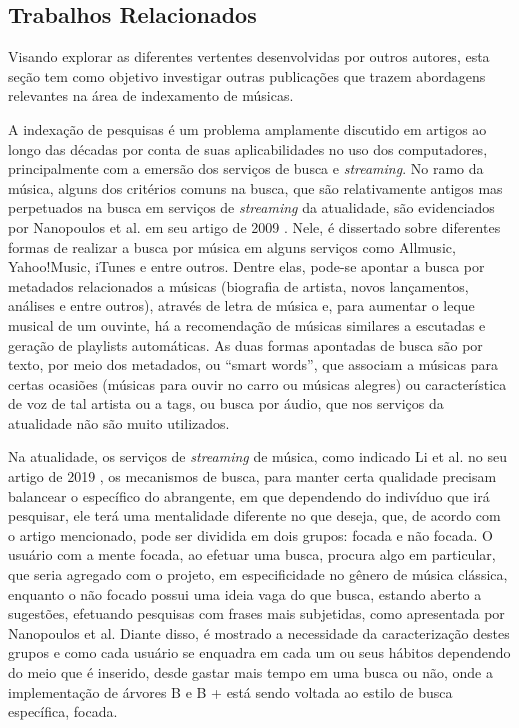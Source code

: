 \documentclass[12pt]{article}
\begin{document}
\subsection{Trabalhos Relacionados}

Visando explorar as diferentes vertentes desenvolvidas por outros autores, esta
seção tem como objetivo investigar outras publicações que trazem abordagens
relevantes na área de indexamento de músicas.

A indexação de pesquisas é um problema amplamente discutido em artigos ao longo
das décadas por conta de suas aplicabilidades no uso dos computadores,
principalmente com a emersão dos serviços de busca e \emph{streaming}. No ramo
da música, alguns dos critérios comuns na busca, que são relativamente antigos
mas perpetuados na busca em serviços de \emph{streaming} da atualidade, são
evidenciados por  Nanopoulos et al. em seu artigo de 2009 \cite{NaRaRuMa:09}.
Nele, é dissertado sobre diferentes formas de realizar a busca por música em
alguns serviços como Allmusic, Yahoo!Music, iTunes e entre outros. Dentre elas,
pode-se apontar a busca por metadados relacionados a músicas (biografia de
artista, novos lançamentos, análises e entre outros), através de letra de música
e, para aumentar o leque musical de um ouvinte, há a recomendação de músicas
similares a escutadas e geração de playlists automáticas. As duas formas
apontadas de busca são por texto, por meio dos metadados, ou “smart words”, que
associam a músicas para certas ocasiões (músicas para ouvir no carro ou músicas
alegres) ou característica de voz de tal artista ou a tags, ou busca por áudio,
que nos serviços da atualidade não são muito utilizados.

Na atualidade, os serviços de \emph{streaming} de música, como indicado Li et
al. no seu artigo de 2019 \cite{LiThChToGa:19}, os mecanismos de busca, para
manter certa qualidade precisam balancear o específico do abrangente, em que
dependendo do indivíduo que irá pesquisar, ele terá uma mentalidade diferente no
que deseja, que, de acordo com o artigo mencionado, pode ser dividida em dois
grupos: focada e não focada. O usuário com a mente focada, ao efetuar uma busca,
procura algo em particular, que seria agregado com o projeto, em especificidade
no gênero de música clássica, enquanto o não focado possui uma ideia vaga do que
busca, estando aberto a sugestões, efetuando pesquisas com frases mais
subjetidas, como apresentada por Nanopoulos et al. Diante disso, é mostrado a
necessidade da caracterização destes grupos e como cada usuário se enquadra em
cada um ou seus hábitos dependendo do meio que é inserido, desde gastar mais
tempo em uma busca ou não, onde a implementação de árvores B e B + está sendo
voltada ao estilo de busca específica, focada.
\end{document}
